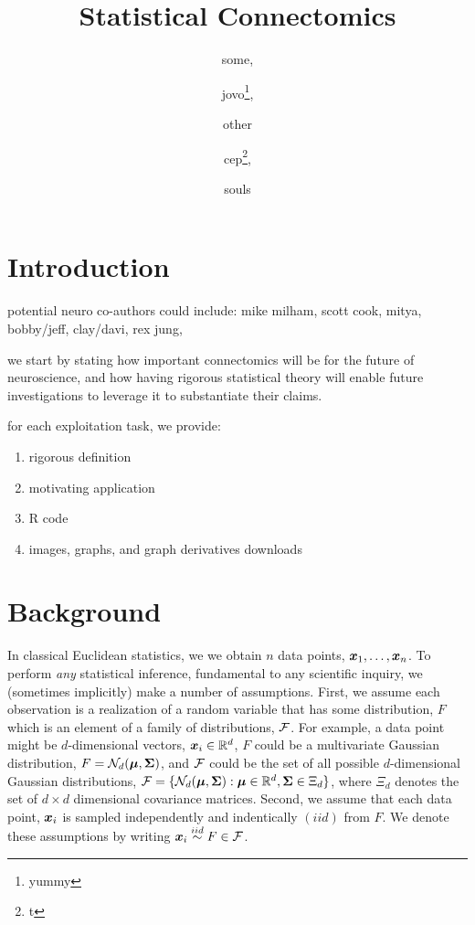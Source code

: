 \documentclass[final,leqno]{article}
\title{\vspace{-50pt}Statistical Connectomics}
\author{some, \and jovo\thanks{yummy}, \and other
        \and cep\thanks{t}, \and souls}
\begin{document}
\maketitle
\tableofcontents

\begin{abstract}

\end{abstract}


\pagestyle{myheadings}
\thispagestyle{plain}

\clearpage
\section{Introduction}


potential neuro co-authors could include: 
mike milham, scott cook, mitya, bobby/jeff, clay/davi, rex jung, 

we start by stating how important connectomics will be for the future of neuroscience, and how having rigorous statistical theory will enable future investigations to leverage it to substantiate their claims.

for each exploitation task, we provide: 
\begin{enumerate}
\item rigorous definition
\item motivating application
\item R code
\item images, graphs, and graph derivatives downloads
\end{enumerate}


\section{Background}

In classical Euclidean statistics, we we obtain $n$ data points, $\boldsymbol{x}_1,\ldots, \boldsymbol{x}_n$.  To perform \emph{any} statistical inference, fundamental to any scientific inquiry, we (sometimes implicitly) make a number of assumptions.   First, we assume  each observation is a realization of a random variable that has some distribution, $F$ which is an element of a family of distributions, $\mathcal{F}$.  For example, a data point might be $d$-dimensional vectors, $\boldsymbol{x}_i \in \mathbb{R}^d$, $F$ could be a multivariate Gaussian distribution, $F=\mathcal{N}_d(\boldsymbol{\mu},\boldsymbol{\Sigma})$, and $\mathcal{F}$ could be the set of all possible $d$-dimensional Gaussian distributions, $\mathcal{F}=\{\mathcal{N}_d(\boldsymbol{\mu},\boldsymbol{\Sigma}) : \boldsymbol{\mu} \in \mathbb{R}^d, \boldsymbol{\Sigma} \in \Xi_d \}$, where $\Xi_d$ denotes the set of $d \times d$ dimensional covariance matrices.  Second, we assume that each data point, $\boldsymbol{x}_i$
 is sampled independently and indentically $(iid)$ from $F$. We denote these assumptions by writing $\boldsymbol{x}_i \overset{iid}{\sim} F \in \mathcal{F}$. 
\end{document}
